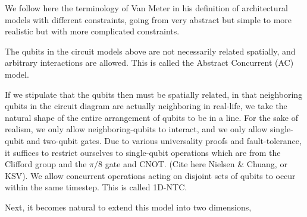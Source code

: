 We follow here the terminology of Van Meter \cite{VanMeter2006} in his
definition of architectural models with different constraints, going from
very abstract but simple to more realistic but with more complicated constraints.

The qubits in the circuit models above are not
necessarily related spatially, and arbitrary interactions are allowed.
This is called the Abstract Concurrent (\textsc{AC}) model.

If we stipulate that the qubits then must be spatially related, in that
neighboring qubits in the circuit diagram are actually neighboring in real-life,
we take the natural shape of the entire arrangement of qubits to be in a line.
For the sake of realism, we only allow neighboring-qubits to interact, and we
only allow single-qubit and two-qubit gates. Due to various universality
proofs and fault-tolerance, it suffices to restrict ourselves to single-qubit
operations which are from the Clifford group and the $\pi/8$ gate and CNOT.
(Cite here Nielsen \& Chuang, or KSV). We allow concurrent operations
acting on disjoint sets of qubits to occur within the same timestep.
This is called \textsc{1D-NTC}.

Next, it becomes natural to extend this model into two dimensions,